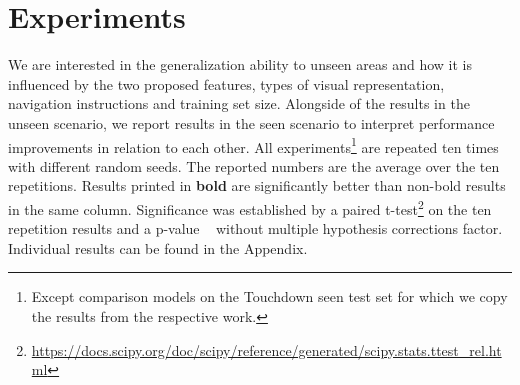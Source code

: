 \documentclass[11pt]{article}
\begin{document}
\section{Experiments}
We are interested in the generalization ability to unseen areas and how it is influenced by the two proposed features, types of visual representation, navigation instructions and training set size. Alongside of the results in the unseen scenario, we report results in the seen scenario to interpret performance improvements in relation to each other. All experiments\footnote{Except comparison models on the Touchdown seen test set for which we copy the results from the respective work.} are repeated ten times with different random seeds. The reported numbers are the average over the ten repetitions. Results printed in \textbf{bold} are significantly better than non-bold results in the same column. Significance was established by a paired t-test\footnote{\url{https://docs.scipy.org/doc/scipy/reference/generated/scipy.stats.ttest_rel.html}} on the ten repetition results and a p-value ~ without multiple hypothesis corrections factor. Individual results can be found in the Appendix. 
\end{document}
